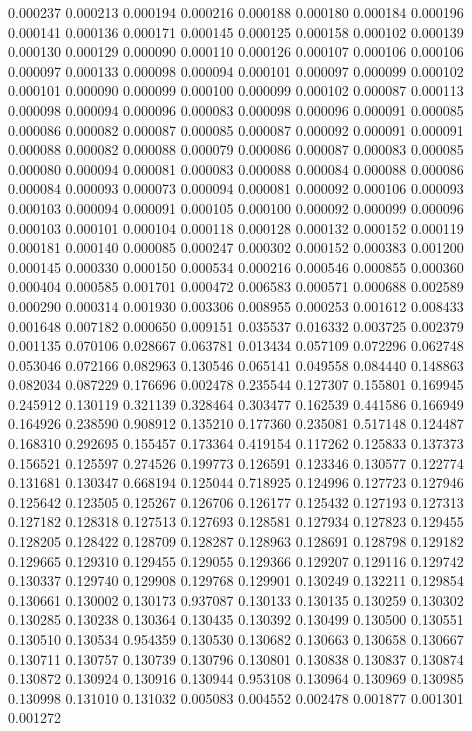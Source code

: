 0.000237
0.000213
0.000194
0.000216
0.000188
0.000180
0.000184
0.000196
0.000141
0.000136
0.000171
0.000145
0.000125
0.000158
0.000102
0.000139
0.000130
0.000129
0.000090
0.000110
0.000126
0.000107
0.000106
0.000106
0.000097
0.000133
0.000098
0.000094
0.000101
0.000097
0.000099
0.000102
0.000101
0.000090
0.000099
0.000100
0.000099
0.000102
0.000087
0.000113
0.000098
0.000094
0.000096
0.000083
0.000098
0.000096
0.000091
0.000085
0.000086
0.000082
0.000087
0.000085
0.000087
0.000092
0.000091
0.000091
0.000088
0.000082
0.000088
0.000079
0.000086
0.000087
0.000083
0.000085
0.000080
0.000094
0.000081
0.000083
0.000088
0.000084
0.000088
0.000086
0.000084
0.000093
0.000073
0.000094
0.000081
0.000092
0.000106
0.000093
0.000103
0.000094
0.000091
0.000105
0.000100
0.000092
0.000099
0.000096
0.000103
0.000101
0.000104
0.000118
0.000128
0.000132
0.000152
0.000119
0.000181
0.000140
0.000085
0.000247
0.000302
0.000152
0.000383
0.001200
0.000145
0.000330
0.000150
0.000534
0.000216
0.000546
0.000855
0.000360
0.000404
0.000585
0.001701
0.000472
0.006583
0.000571
0.000688
0.002589
0.000290
0.000314
0.001930
0.003306
0.008955
0.000253
0.001612
0.008433
0.001648
0.007182
0.000650
0.009151
0.035537
0.016332
0.003725
0.002379
0.001135
0.070106
0.028667
0.063781
0.013434
0.057109
0.072296
0.062748
0.053046
0.072166
0.082963
0.130546
0.065141
0.049558
0.084440
0.148863
0.082034
0.087229
0.176696
0.002478
0.235544
0.127307
0.155801
0.169945
0.245912
0.130119
0.321139
0.328464
0.303477
0.162539
0.441586
0.166949
0.164926
0.238590
0.908912
0.135210
0.177360
0.235081
0.517148
0.124487
0.168310
0.292695
0.155457
0.173364
0.419154
0.117262
0.125833
0.137373
0.156521
0.125597
0.274526
0.199773
0.126591
0.123346
0.130577
0.122774
0.131681
0.130347
0.668194
0.125044
0.718925
0.124996
0.127723
0.127946
0.125642
0.123505
0.125267
0.126706
0.126177
0.125432
0.127193
0.127313
0.127182
0.128318
0.127513
0.127693
0.128581
0.127934
0.127823
0.129455
0.128205
0.128422
0.128709
0.128287
0.128963
0.128691
0.128798
0.129182
0.129665
0.129310
0.129455
0.129055
0.129366
0.129207
0.129116
0.129742
0.130337
0.129740
0.129908
0.129768
0.129901
0.130249
0.132211
0.129854
0.130661
0.130002
0.130173
0.937087
0.130133
0.130135
0.130259
0.130302
0.130285
0.130238
0.130364
0.130435
0.130392
0.130499
0.130500
0.130551
0.130510
0.130534
0.954359
0.130530
0.130682
0.130663
0.130658
0.130667
0.130711
0.130757
0.130739
0.130796
0.130801
0.130838
0.130837
0.130874
0.130872
0.130924
0.130916
0.130944
0.953108
0.130964
0.130969
0.130985
0.130998
0.131010
0.131032
0.005083
0.004552
0.002478
0.001877
0.001301
0.001272
